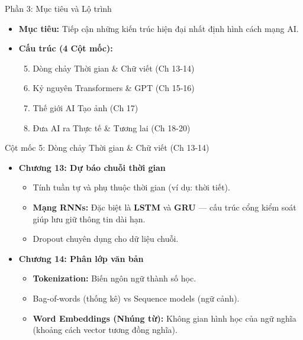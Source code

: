 \documentclass[aspectratio=169]{beamer}
\begin{document}
\begin{frame}{Phần 3: Mục tiêu và Lộ trình}
    \begin{itemize}
        \item \textbf{Mục tiêu:} Tiếp cận những kiến trúc hiện đại nhất định hình cách mạng AI.
        \item \textbf{Cấu trúc (4 Cột mốc):}
        \begin{enumerate}
            \setcounter{enumi}{4}
            \item Dòng chảy Thời gian \& Chữ viết (Ch 13-14)
            \item Kỷ nguyên Transformers \& GPT (Ch 15-16)
            \item Thế giới AI Tạo ảnh (Ch 17)
            \item Đưa AI ra Thực tế \& Tương lai (Ch 18-20)
        \end{enumerate}
    \end{itemize}
\end{frame}

\begin{frame}{Cột mốc 5: Dòng chảy Thời gian \& Chữ viết (Ch 13-14)}
    \begin{itemize}
        \item \textbf{Chương 13: Dự báo chuỗi thời gian}
        \begin{itemize}
            \item Tính tuần tự và phụ thuộc thời gian (ví dụ: thời tiết).
            \item \textbf{Mạng RNNs:} Đặc biệt là \textbf{LSTM} và \textbf{GRU} — cấu trúc cổng kiểm soát giúp lưu giữ thông tin dài hạn.
            \item Dropout chuyên dụng cho dữ liệu chuỗi.
        \end{itemize}
        \item \textbf{Chương 14: Phân lớp văn bản}
        \begin{itemize}
            \item \textbf{Tokenization:} Biến ngôn ngữ thành số học.
            \item Bag-of-words (thống kê) vs Sequence models (ngữ cảnh).
            \item \textbf{Word Embeddings (Nhúng từ):} Không gian hình học của ngữ nghĩa (khoảng cách vector tương đồng nghĩa).
        \end{itemize}
    \end{itemize}
\end{frame}
\end{document}
